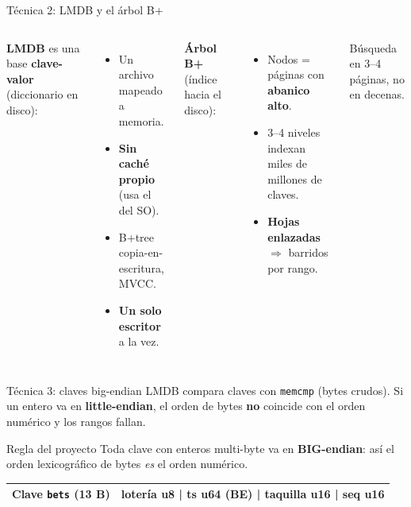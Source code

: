 \documentclass[aspectratio=169,11pt]{beamer}
\begin{document}
\begin{frame}{Técnica 2: LMDB y el árbol B+}
  \begin{columns}
      \textbf{LMDB} es una base \textbf{clave-valor} (diccionario en disco):
      \begin{itemize}
        \item Un archivo mapeado a memoria.
        \item \textbf{Sin caché propio} (usa el del SO).
        \item B+tree copia-en-escritura, MVCC.
        \item \textbf{Un solo escritor} a la vez.
      \end{itemize}
      \textbf{Árbol B+} (índice hacia el disco):
      \begin{itemize}
        \item Nodos = páginas con \textbf{abanico alto}.
        \item 3--4 niveles indexan miles de millones de claves.
        \item \textbf{Hojas enlazadas} $\Rightarrow$ barridos por rango.
      \end{itemize}
      \vspace{0.2cm}
      \footnotesize Búsqueda en 3--4 páginas, no en decenas.
  \end{columns}
\end{frame}

\begin{frame}{Técnica 3: claves big-endian}
  LMDB compara claves con \texttt{memcmp} (bytes crudos). Si un entero va en
  \textbf{little-endian}, el orden de bytes \textbf{no} coincide con el orden
  numérico y los rangos fallan.

  \vspace{0.3cm}
  \begin{block}{Regla del proyecto}
    Toda clave con enteros multi-byte va en \textbf{BIG-endian}: así el orden
    lexicográfico de bytes \emph{es} el orden numérico.
  \end{block}

  \vspace{0.2cm}
  \begin{tabular}{@{}ll@{}}
    \toprule
    Clave \texttt{bets} (13 B) & lotería u8 | ts u64 (BE) | taquilla u16 | seq u16 \\
    \bottomrule
  \end{tabular}
\end{frame}
\end{document}

